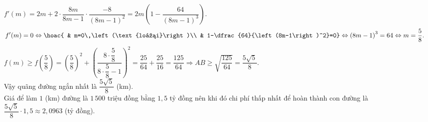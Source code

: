 \begin{bt}
{		 $f'(m)=2m+2\cdot\dfrac{8m}{8m-1}\cdot\dfrac{-8}{\left(8m-1\right)^2}=2m\left(1-\dfrac{64}{\left(8m-1\right)^3}\right)$. $$f'(m)=0\Leftrightarrow\hoac{
		& m=0\,\left(\text{loại}\right)\\ 
		& 1-\dfrac{64}{\left(8m-1\right)^2}=0} 
		\Leftrightarrow{\left(8m-1\right)^3}=64\Leftrightarrow  m=\dfrac{5}{8}.$$
		$ f(m)\ge f\left(\dfrac{5}{8}\right)=\left(\dfrac{5}{8}\right)^2+\left(\dfrac{8\cdot\dfrac{5}{8}}{8\cdot\dfrac{5}{8}-1}\right)^2=\dfrac{25}{64}+\dfrac{25}{16}=\dfrac{125}{64}\Rightarrow  AB\ge\sqrt{\dfrac{125}{64}}=\dfrac{5\sqrt{5}}{8}$.\\
		 Vậy quãng đường ngắn nhất là $\dfrac{5\sqrt{5}}{8}$ (km).\\
	Giá để làm $1$ (km) đường là $1\,500$ triệu đồng bằng $1{,}5$  tỷ đồng nên khi đó chi phí thấp nhất để hoàn thành con đường là $\dfrac{5\sqrt{5}}{8}\cdot1{,}5\approx 2{,}0963$ (tỷ đồng).}
\end{bt}

